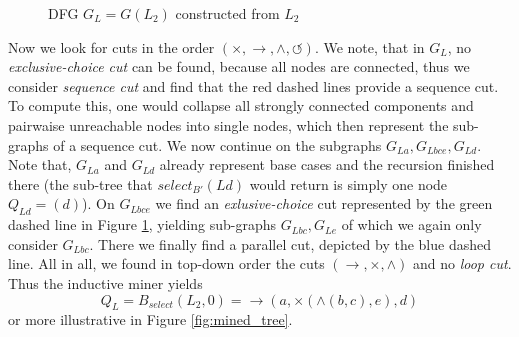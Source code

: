 \documentclass[a4paper]{IEEEtran}
\begin{document}
\begin{figure}[h!]
    \centering

    \caption{DFG $ G_L = G(L_2)$ constructed from $L_2$}
    \label{graph:dfg}
\end{figure}
Now we look for cuts in the order $(\times, \rightarrow, \wedge, \circlearrowleft)$. We note, that in $G_L$, no \textit{exclusive-choice cut} can be found, because all nodes are connected, thus we consider \textit{sequence cut} and find that the red dashed lines provide a sequence cut. To compute this, one would collapse all strongly connected components and pairwaise unreachable nodes into single nodes, which then represent the sub-graphs of a sequence cut. We now continue on the subgraphs $G_{La}, G_{Lbce}, G_{Ld}$. Note that, $G_{La}$ and $G_{Ld}$ already represent base cases and the recursion finished there (the sub-tree that $select_{B'}(Ld)$ would return is simply one node $Q_{Ld} = (d)$). On $G_{Lbce}$ we find an \textit{exlusive-choice} cut represented by the green dashed line in Figure \ref{graph:dfg}, yielding sub-graphs $ G_{Lbc}, G_{Le}$ of which we again only consider $G_{Lbc}$. There we finally find a parallel cut, depicted by the blue dashed line. All in all, we found in top-down order the cuts $(\rightarrow, \times, \wedge)$ and no \textit{loop cut}. Thus the inductive miner yields
$$
Q_L = B_{select}(L_2,0) = \rightarrow(a, \times(\wedge(b,c), e),d)
$$
or more illustrative in Figure \ref{fig:mined_tree}.
\end{document}
